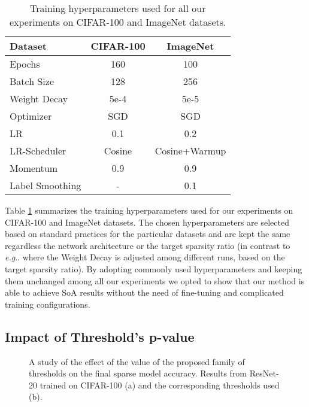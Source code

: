\documentclass{article}
\makeatletter
\DeclareRobustCommand\onedot{\futurelet\@let@token\@onedot}
\def\@onedot{\ifx\@let@token.\else.\null\fi\xspace}
\def\eg{\emph{e.g}\onedot}
\makeatother
\begin{document}
\begin{table}[h]
\begin{center}
\begin{tabular}{lcc}
\toprule
Dataset 	& CIFAR-100 & ImageNet  \\
\midrule\midrule
Epochs 		 & 	160		& 	100		\\
Batch Size   & 	128		& 	256		\\
Weight Decay & 5e-4     &  5e-5    \\
Optimizer    &   SGD    &    SGD		\\
LR			 & 0.1      &   0.2		\\
LR-Scheduler & Cosine   & Cosine+Warmup\\
Momentum 	 & 0.9	    &  0.9		\\
Label Smoothing & -    & 0.1\\ 
\bottomrule
\end{tabular}
\end{center}
\vspace{10pt}
\caption{ Training hyperparameters used for all our experiments on CIFAR-100 and ImageNet datasets.}
\label{tab:hyper_feather}
\end{table}


Table \ref{tab:hyper_feather} summarizes the training hyperparameters used for our experiments on CIFAR-100 \cite{krizhevsky2009learning} and ImageNet \cite{russakovsky2015imagenet} datasets. The chosen hyperparameters  are selected based on standard practices for the particular datasets and are kept the same regardless the network architecture or the target sparsity ratio  (in contrast to \eg \cite{kusupati2020soft,  vanderschueren2023straight} where the Weight Decay is adjusted among different runs, based on the target sparsity ratio).  By adopting commonly used hyperparameters and keeping them unchanged among all our experiments we opted to show that our method is able to achieve SoA results  without the need of fine-tuning and complicated training configurations.


\subsection{Impact of Threshold's p-value} 


\begin{figure}[h]
\begin{center}
\caption{A study of the effect of the  value of the proposed family of thresholds on the final sparse model accuracy. Results from ResNet-20 trained on CIFAR-100 (a) and the corresponding thresholds used (b).}
\label{fig:abl4}
\end{center}
\end{figure}
\end{document}
